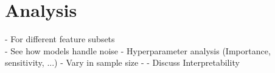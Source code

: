 \chapter{Analysis}
- For different feature subsets \\ 
	- See how models handle noise
	- Hyperparameter analysis (Importance, sensitivity, ...)
	- Vary in sample size
	- 
- Discuss Interpretability 